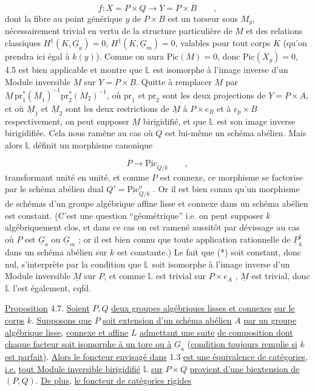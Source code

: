 \begin{equation*}
f : X = P \times Q \longrightarrow Y = P \times B \qquad ,
\end{equation*}
dont la fibre au point générique $y$ de $P \times B$ est un torseur sous $M_y$, nécessairement trivial en vertu de la structure particulière de $M$ et des relations classiques $H^1(K,\underline{G}_a) = 0$, $H^1(K,\underline{G}_m) = 0$, valables pour tout corps $K$ (qu'on prendra ici égal à $k(y)$). Comme on aura $\mathrm{Pic}(M) = 0$, donc $\mathrm{Pic}(X_y) = 0$, 4.5 est bien applicable et montre que $\mathbb{L}$ est isomorphe à l'image inverse d'un Module inversible $\underline{M}$ sur $Y = P \times B$. Quitte à remplacer $\underline{M}$ par $\underline{M}\,\mathrm{pr}_1^*(\underline{M}_1)^{-1}\mathrm{pr}_2^*(M_2)^{-1}$, où $\mathrm{pr}_1$ et $\mathrm{pr}_2$ sont les deux projections de $Y=P \times A$, et où $\underline{M}_1$ et $\underline{M}_2$ sont les deux restrictions de $\underline{M}$ à $P \times e_B$ et à $e_p \times B$ respectivement, on peut supposer $\underline{M}$ birigidifié, et que $\mathbb{L}$ est son image inverse birigidifiée. Cela nous ramène au cas où $Q$ est lui-même un schéma abélien. Mais alors $\mathbb{L}$ définit un morphisme canonique

\begin{equation}\tag{*}
P \longrightarrow \underline{\mathrm{Pic}}_{Q/k} \qquad ,
\end{equation}
transformant unité en unité, et comme $P$ est connexe, ce morphisme se
factorise par le schéma abélien dual $Q' = \underline{\mathrm{Pic}}^{\mathrm{o}}_{Q/k}$ . Or il est bien connu qu'un morphisme de schémas d'un groupe algébrique affine lisse et connexe dans un schéma abélien est constant. (C'est une question ``géométrique'' i.e. on peut supposer $k$ algébriquement clos, et dans ce cas on est ramené aussitôt par dévissage au cas où $P$ est $\underline{G}_a$ ou $\underline{G}_m$ ; or il est bien connu que toute application rationnelle de $\underline{P}^1_k$ dans un schéma abélien sur $k$ est constante.) Le fait que (*) soit constant, donc nul, s'interprète par la condition que $\mathbb{L}$ soit isomorphe à l'image inverse d'un Module inversible $\underline{M}$ sur $P$, et comme $\mathbb{L}$ est trivial sur $P \times e_A$ , $\underline{M}$ est trivial, donc $\mathbb{L}$ l'est également, cqfd.

\underline{Proposition} 4.7. \underline{Soient} $P,Q$ \underline{deux groupes algébriques lisses et connexes} \underline{sur le corps} $k$. \underline{Supposons que} $P$ \underline{soit extension d'un schéma abélien} $A$ \underline{par un groupe algébrique lisse}, \underline{connexe et affine} $L$ \underline{admettant une suite} \underline{de composition dont chaque facteur soit isomorphe à un tore ou à} $\underline{G}_a$ (\underline{condition toujours remplie si} $k$ \underline{est parfait)}. \underline{Alors le foncteur envisagé dans} 1.3 \underline{est une équivalence de catégories}, \underline{i.e.} \underline{tout Module inversible birigidifié} $\mathbb{L}$ \underline{sur} $P \times Q$ \underline{provient d'une biextension de} $(P,Q)$. \underline{De plus}, \underline{le foncteur de catégories rigides}

